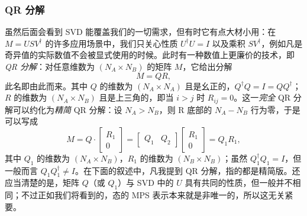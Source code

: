 \subsubsection{QR 分解}
虽然后面会看到 SVD 能覆盖我们的一切需求，但有时它有点大材小用：在 $M=USV^\dagger$ 的许多应用场景中，我们只关心性质 $U^\dagger U = I$ 以及乘积 $SV^\dagger$，例如凡是奇异值的实际数值不会被显式使用的时候。此时有一种数值上更廉价的技术，即 {\em QR 分解}：对任意维数为 $(N_A \times N_B)$ 的矩阵 $M$，它给出分解
\begin{equation}
M = QR ,
\label{eq:QRdecomposition}
\end{equation}
此名即由此而来。其中 $Q$ 的维数为 $(N_A \times N_A)$ 且是幺正的，$Q^\dagger Q = I = Q Q^\dagger$；$R$ 的维数为 $(N_A \times N_B)$ 且是上三角的，即当 $i>j$ 时 $R_{ij}=0$。这一{\em 完全} QR 分解可以约化为{\em 精简} QR 分解：设 $N_A > N_B$，则 R 底部的 $N_A-N_B$ 行为零，于是可以写成
\begin{equation}
M=Q \cdot \left[ \begin{array}{c} R_1 \\ 0 \end{array} \right] = \left[ \begin{array}{cc} Q_1 & Q_2 \end{array} \right] \left[ \begin{array}{c} R_1 \\ 0 \end{array} \right] = Q_1 R_1 ,
\label{eq:thinQRdecomposition}
\end{equation}
其中 $Q_1$ 的维数为 $(N_A \times N_B)$，$R_1$ 的维数为 $(N_B \times N_B)$；虽然 $Q_1^\dagger Q_1 = I$，但一般而言 $Q_1 Q_1^\dagger \neq I$。在下面的叙述中，凡我提到 QR 分解，指的都是精简版。还应当清楚的是，矩阵 $Q$（或 $Q_1$）与 SVD 中的 $U$ 具有共同的性质，但一般并不相同；不过正如我们将看到的，态的 MPS 表示本来就是非唯一的，所以这无关紧要。

